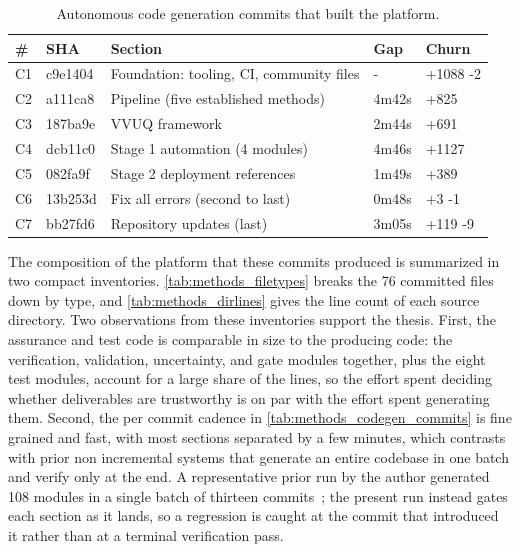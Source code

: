 \begin{table}[H]
\caption{Autonomous code generation commits that built the platform.}
\label{tab:methods_codegen_commits}
\centering
\begin{tabularx}{\textwidth}{C{0.7cm} L{2.0cm} >{\raggedright\arraybackslash}X C{1.6cm} C{2.0cm}}
\toprule
\textbf{\#} & \textbf{SHA} & \textbf{Section} & \textbf{Gap} & \textbf{Churn} \\
\midrule
  C1 & c9e1404 & Foundation: tooling, CI, community files & - & +1088 -2 \\
  C2 & a111ca8 & Pipeline (five established methods) & 4m42s & +825 \\
  C3 & 187ba9e & VVUQ framework & 2m44s & +691 \\
  C4 & dcb11c0 & Stage 1 automation (4 modules) & 4m46s & +1127 \\
  C5 & 082fa9f & Stage 2 deployment references & 1m49s & +389 \\
  C6 & 13b253d & Fix all errors (second to last) & 0m48s & +3 -1 \\
  C7 & bb27fd6 & Repository updates (last) & 3m05s & +119 -9 \\
\bottomrule
\end{tabularx}
\end{table}

The composition of the platform that these commits produced is summarized in two
compact inventories. \autoref{tab:methods_filetypes} breaks the 76 committed
files down by type, and \autoref{tab:methods_dirlines} gives the line count of
each source directory. Two observations from these inventories support the
thesis. First, the assurance and test code is comparable in size to the
producing code: the verification, validation, uncertainty, and gate modules
together, plus the eight test modules, account for a large share of the lines, so
the effort spent deciding whether deliverables are trustworthy is on par with the
effort spent generating them. Second, the per commit cadence in
\autoref{tab:methods_codegen_commits} is fine grained and fast, with most
sections separated by a few minutes, which contrasts with prior non incremental
systems that generate an entire codebase in one batch and verify only at the end.
A representative prior run by the author generated 108 modules in a single batch
of thirteen commits~\cite{kawchak2026sponsor}; the present run instead gates each
section as it lands, so a regression is caught at the commit that introduced it
rather than at a terminal verification pass.

